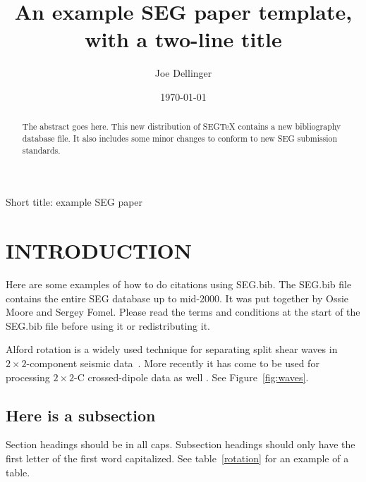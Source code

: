 \documentclass[manuscript]{geophysics}
\begin{document}
\title{An example SEG paper template,\\with a two-line title}

\author{Joe Dellinger}
\address{BP Amoco UTG, 200 Westlake Park Blvd, Houston, TX, 77079, USA}


\date{\today}

\maketitle

{Short title: example SEG paper}

\begin{abstract}
The abstract goes here.
This new distribution of SEGTeX contains a new bibliography database file.
It also includes some minor changes to conform to new SEG submission standards.
\end{abstract}

\section{INTRODUCTION}
Here are some examples of how to do citations using SEG.bib.
The SEG.bib file contains the entire SEG database up to mid-2000. It was
put together by Ossie Moore and Sergey Fomel. Please read the terms and
conditions at the start of the SEG.bib file before using it or
redistributing it.

Alford  rotation is a widely used technique for
separating split shear waves in $2{\times}2$-component
seismic data~\cite{GEO53-03-03040313}.
More recently it has come to be used for processing $2{\times}2$-C
crossed-dipole data as well \cite{SEG-1994-0233,SEG-1994-1139,SEG-1994-1143}.
See Figure~\ref{fig:waves}.


\subsection{Here is a subsection}
Section headings should be in all caps. Subsection headings should only
have the first letter of the first word capitalized.
See table~\ref{rotation} for an example of a table.
\end{document}
